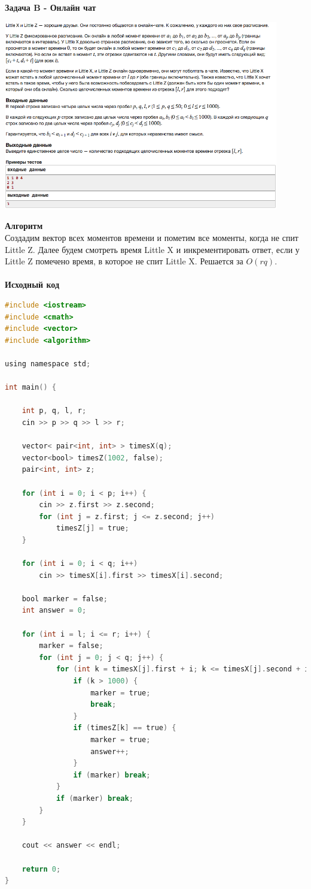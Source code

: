 \documentclass[a4paper,12pt]{article}
\begin{document}
\newpage
\textbf{{\large Задача B - Онлайн чат}} \\
\begin{center}
\includegraphics[width=0.9\textwidth]{C_268/C_268_B.png}\\ [1cm]
\end{center}
\textbf{{\large Алгоритм}} \\
Создадим вектор всех моментов времени и пометим все моменты, когда не спит Little Z. Далее будем смотреть время Little X и инкрементировать ответ, если у Little Z помечено время, в которое не спит Little X. Решается за $O(rq)$.\\ 
\\
\textbf{{\large Исходный код}}
\begin{lstlisting}[language=C]
#include <iostream>
#include <cmath>
#include <vector>
#include <algorithm>

using namespace std;

int main() {

    int p, q, l, r;
    cin >> p >> q >> l >> r;
    
    vector< pair<int, int> > timesX(q);
    vector<bool> timesZ(1002, false);
    pair<int, int> z;
    
    for (int i = 0; i < p; i++) {
        cin >> z.first >> z.second;
        for (int j = z.first; j <= z.second; j++)
            timesZ[j] = true;
    }
    
    for (int i = 0; i < q; i++)
        cin >> timesX[i].first >> timesX[i].second;
    
    bool marker = false;
    int answer = 0;
    
    for (int i = l; i <= r; i++) {
        marker = false;
        for (int j = 0; j < q; j++) {
            for (int k = timesX[j].first + i; k <= timesX[j].second + i; k++) {
                if (k > 1000) {
                    marker = true;
                    break;
                }
                if (timesZ[k] == true) {
                    marker = true;
                    answer++;
                }
                if (marker) break;
            }
            if (marker) break;
        }
    }
    
    cout << answer << endl;
    
    return 0;
}
\end{lstlisting}
\end{document}
